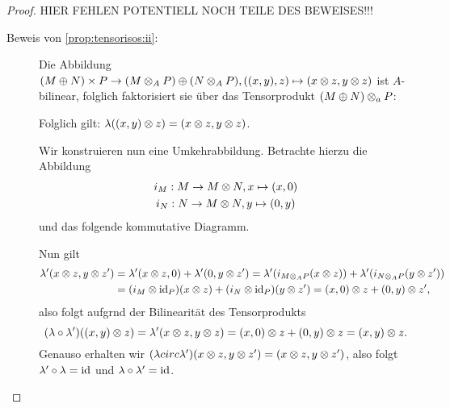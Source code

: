 \documentclass[12pt,a4paper]{scrartcl}
\theoremstyle{cplain}
\theoremstyle{cdef}
\begin{document}
\begin{proof}
	HIER FEHLEN POTENTIELL NOCH TEILE DES BEWEISES!!!
	\begin{description}
		\item[Beweis von \ref{prop:tensorisos:ii}:] Die Abbildung $(M\oplus N)\times P \to (M\otimes_AP) \oplus(N\otimes_AP), ((x,y),z)\mapsto (x\otimes z, y\otimes z)$ ist $A$-bilinear, folglich faktorisiert sie über das Tensorprodukt $(M\oplus N)\otimes_aP$:
		\begin{figure}[H]
			\centering
		\end{figure}
		Folglich gilt: $\lambda((x,y)\otimes z) = (x\otimes z, y\otimes z)$.

		Wir konstruieren nun eine Umkehrabbildung. Betrachte hierzu die Abbildung
		\begin{gather*}
			i_M: M \to M \otimes N, x \mapsto (x,0) \\
			i_N : N \to M \otimes N, y \mapsto (0,y)
		\end{gather*}
		und das folgende kommutative Diagramm.
		\begin{figure}[H]
			\centering
		\end{figure}
		Nun gilt
		\begin{align*}
			\lambda'(x \otimes z, y \otimes z') &= \lambda'(x \otimes z,0)+ \lambda'(0,y \otimes z') = \lambda'(i_{M \otimes_A P}(x \otimes z))+ \lambda'(i_{N \otimes_A P}(y \otimes z')) \\
			&= (i_M \otimes \operatorname{id}_P)(x \otimes z) + (i_N \otimes \operatorname{id}_P)(y \otimes z') = (x,0) \otimes z + (0,y) \otimes z',
		\end{align*}
		also folgt aufgrnd der Bilinearität des Tensorprodukts \[ (\lambda \circ \lambda')((x,y)\otimes z) = \lambda'(x \otimes z, y \otimes z) = (x,0) \otimes z + (0,y) \otimes z = (x,y)\otimes z .\]
		Genauso erhalten wir $(\lambda circ \lambda')(x \otimes z,y \otimes z') = (x\otimes z, y \otimes z')$, also folgt $\lambda' \circ \lambda = \operatorname{id}$ und $\lambda \circ \lambda' = \operatorname{id}$.
		\qedhere
	\end{description}
\end{proof}
\end{document}
